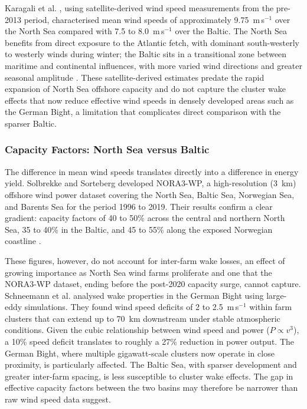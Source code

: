 \vspace{4pt}

Karagali et al. \cite{Karagali2013}, using satellite-derived wind speed measurements from the pre-2013 period, characterised mean wind speeds of approximately 9.75~m\,s$^{-1}$ over the North Sea compared with 7.5 to 8.0~m\,s$^{-1}$ over the Baltic. The North Sea benefits from direct exposure to the Atlantic fetch, with dominant south-westerly to westerly winds during winter; the Baltic sits in a transitional zone between maritime and continental influences, with more varied wind directions and greater seasonal amplitude \cite{Karagali2013}. These satellite-derived estimates predate the rapid expansion of North Sea offshore capacity and do not capture the cluster wake effects that now reduce effective wind speeds in densely developed areas such as the German Bight, a limitation that complicates direct comparison with the sparser Baltic.

\subsubsection{Capacity Factors: North Sea versus Baltic}\label{sec:capacity_factors}

The difference in mean wind speeds translates directly into a difference in energy yield. Solbrekke and Sorteberg \cite{Solbrekke2022} developed NORA3-WP, a high-resolution (3~km) offshore wind power dataset covering the North Sea, Baltic Sea, Norwegian Sea, and Barents Sea for the period 1996 to 2019. Their results confirm a clear gradient: capacity factors of 40 to 50\% across the central and northern North Sea, 35 to 40\% in the Baltic, and 45 to 55\% along the exposed Norwegian coastline \cite{Solbrekke2022}.

\vspace{4pt}

These figures, however, do not account for inter-farm wake losses, an effect of growing importance as North Sea wind farms proliferate and one that the NORA3-WP dataset, ending before the post-2020 capacity surge, cannot capture. Schneemann et al. \cite{Schneemann2022} analysed wake properties in the German Bight using large-eddy simulations. They found wind speed deficits of 2 to 2.5~m\,s$^{-1}$ within farm clusters that can extend up to 70~km downstream under stable atmospheric conditions. Given the cubic relationship between wind speed and power ($P \propto v^3$), a 10\% speed deficit translates to roughly a 27\% reduction in power output. The German Bight, where multiple gigawatt-scale clusters now operate in close proximity, is particularly affected. The Baltic Sea, with sparser development and greater inter-farm spacing, is less susceptible to cluster wake effects. The gap in effective capacity factors between the two basins may therefore be narrower than raw wind speed data suggest.

